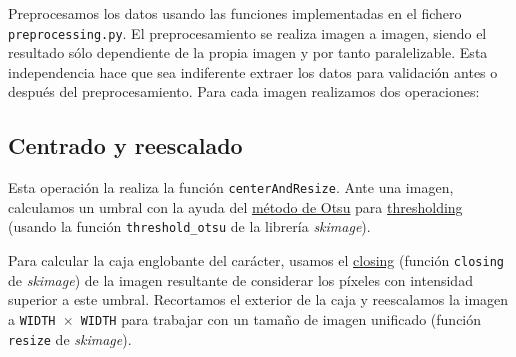 \documentclass[a4]{article}
\begin{document}


Preprocesamos los datos usando las funciones implementadas en el
fichero \texttt{preprocessing.py}. El preprocesamiento se realiza
imagen a imagen, siendo el resultado sólo dependiente de la propia
imagen y por tanto paralelizable. Esta independencia hace que sea
indiferente extraer los datos para validación antes o después del
preprocesamiento. Para cada imagen realizamos dos operaciones:

\subsection{Centrado y reescalado}

Esta operación la realiza la función \texttt{centerAndResize}. Ante
una imagen, calculamos un umbral con la ayuda del \href{https://en.wikipedia.org/wiki/Otsu%27s_method}{método de Otsu}
  para
\href{https://en.wikipedia.org/wiki/Thresholding_(image_processing)}{thresholding} (usando la función \texttt{threshold\_otsu} de la librería \textit{skimage}). 

Para calcular la caja englobante del carácter, usamos el
\href{https://en.wikipedia.org/wiki/Closing_%28morphology%29}{closing}
  (función \texttt{closing} de \textit{skimage}) de la imagen
  resultante de considerar los píxeles con intensidad superior a este
  umbral. Recortamos el exterior de la caja y reescalamos la imagen a
  \texttt{WIDTH $\times$ WIDTH} para trabajar con un tamaño de imagen
  unificado (función \texttt{resize} de \textit{skimage}).

\end{document}
